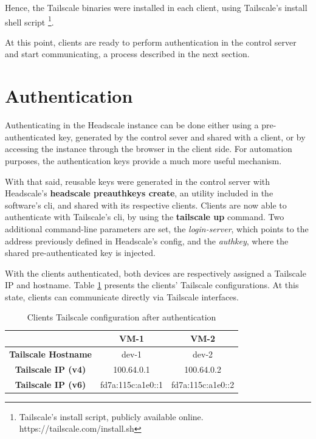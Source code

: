 \documentclass[11pt,twoside,a4paper]{report}
\begin{document}
Hence, the Tailscale binaries were installed in each client, using Tailscale's install shell script \footnote{Tailscale's install script, publicly available online. https://tailscale.com/install.sh}.

At this point, clients are ready to perform authentication in the control server and start communicating, a process described in the next section.

\section{Authentication}

Authenticating in the Headscale instance can be done either using a pre-authenticated key, generated by the control sever and shared with a client, or by accessing the instance through the browser in the client side. For automation purposes, the authentication keys provide a much more useful mechanism.

With that said, reusable keys were generated in the control server with Headscale's \textbf{headscale preauthkeys create}, an utility included in the software's \ac{cli}, and shared with its respective clients. Clients are now able to authenticate with Tailscale's \ac{cli}, by using the \textbf{tailscale up} command. Two additional command-line parameters are set, the \emph{login-server}, which points to the address previously defined in Headscale's config, and the \emph{authkey}, where the shared pre-authenticated key is injected.

With the clients authenticated, both devices are respectively assigned a Tailscale IP and hostname. Table \ref{tab:tsips} presents the clients' Tailscale configurations. At this state, clients can communicate directly via Tailscale interfaces.

\begin{table}[]
\centering
\begin{tabular}{c|c|c|}
\cline{2-3}
\textbf{}                                         & \textbf{VM-1} & \textbf{VM-2} \\ \hline
\multicolumn{1}{|c|}{\textbf{Tailscale Hostname}} & dev-1         & dev-2         \\ \hline
\multicolumn{1}{|c|}{\textbf{Tailscale IP (v4)}}  & 100.64.0.1    & 100.64.0.2    \\ \hline
\multicolumn{1}{|c|}{\textbf{Tailscale IP (v6)}}  & fd7a:115c:a1e0::1     & fd7a:115c:a1e0::2         \\ \hline
\end{tabular}
\caption{Clients Tailscale configuration after authentication}
\label{tab:tsips}
\end{table}
\end{document}

